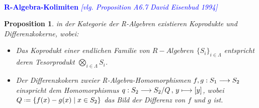 \documentclass[10pt,a4paper]{report}
\newcommand{\ModulsOfDifferenzials}{David Eisenbud 1994}
\newcounter{Aussage}[chapter]
\newtheorem{prop}[Aussage]{Proposition}
\newcommand{\functionfront}[3]{\nolinebreak{#1:#2 \longrightarrow #3}}
\newcommand{\function}[5]{\nolinebreak{#1:#2 \longrightarrow #3 \, , \, #4 \longmapsto #5}}
\newcommand*{\defeq}{\mathrel{\vcenter{\baselineskip0.5ex \lineskiplimit0pt
                     \hbox{\scriptsize.}\hbox{\scriptsize.}}}%
                     =}
\begin{document}
\ \\
\textcolor{blue}{\textbf{R-Algebra-Kolimiten} \textit{[vlg. Proposition A6.7 \ModulsOfDifferenzials]}}
\begin{prop} \label{R-Algebra-Kolimiten}
in der Kategorie der R-Algebren existieren Koprodukte und Differenzkokerne, wobei:
\begin{itemize}
\item[\textbf{1.}] Das Koprodukt einer endlichen Familie von $R-Algebren$ $\lbrace S_i \rbrace_{i \in \Lambda}$ entspricht deren Tesorprodukt $\bigotimes_{i \in \Lambda} S_i$. 
\item[\textbf{2.}] Der Differenzkokern zweier R-Algebra-Homomorphismen $\functionfront{f,g}{S_1}{S_2}$ einspricht dem Homomorphismus $\function{q}{S_2}{S_2/Q}{y}{[y]}$, wobei $Q \defeq \lbrace f(x) - g(x)\mid x \in S_2 \rbrace$ das Bild der Differenz von $f$ und $g$ ist.
\end{itemize}
\end{prop}
\end{document}
